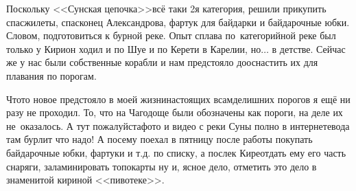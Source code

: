 {Поскольку <<Сунская цепочка>>\mdash всё таки 2\sdash я категория, решили прикупить спасжилеты, спасконец Александрова, фартук для байдарки и байдарочные юбки. Словом, подготовиться к бурной реке. Опыт сплава по~категорийной реке был только у Кири\mdash он ходил и по Шуе и по Керети в Карелии, но$\ldots$ в детстве. Сейчас же у нас были собственные корабли и нам предстояло дооснастить их для плавания по порогам. 

Что\sdash то новое предстояло в моей жизни\mdash настоящих всамделишних порогов я ещё ни разу не проходил. То, что на Чагодоще были обозначены как пороги, на деле их не~оказалось. А тут пожалуйста\mdash фото и видео с реки Суны полно в интернете\mdash вода там бурлит что надо! А посему поехал в пятницу после работы покупать байдарочные юбки, фартуки и т.д. по списку, а после\mdash к Кире\mdash отдать ему его часть снаряги, заламинировать топокарты ну и, ясное дело, отметить это дело в знаменитой кириной <<пивотеке>>.





}